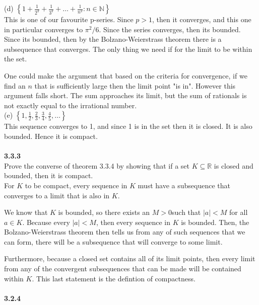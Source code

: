 (d) $\left\{ 1 + \frac{1}{2^2} + \frac{1}{3^2} + \ldots + \frac{1}{n^2} : n\in\mathbb{N} \right\}$
\\

This is one of our favourite p-series.
Since $p>1$, then it converges, and this one in particular converges to $\pi^2 / 6$.
Since the series converges, then its bounded.
Since its bounded, then by the Bolzano-Weierstrass theorem there is a subsequence that converges.
The only thing we need if for the limit to be within the set.

One could make the argument that based on the criteria for convergence, if we find an $n$ that is sufficiently large
then the limit point "is in".
However this argument falls short. The sum approaches its limit, but the sum of rationals is not exactly equal
to the irrational number. 
\\

(e) $\left\{ 1, \frac{1}{2}, \frac{2}{3}, \frac{3}{4}, \frac{4}{5}, \ldots \right\}$
\\

This sequence converges to 1, and since 1 is in the set then it is closed.
It is also bounded.
Hence it is compact.
\\~\\



\textbf{3.3.3}
\\

Prove the converse of theorem 3.3.4 by showing that if a set $K \subseteq \mathbb{R}$ is closed and bounded,
then it is compact.
\\

For $K$ to be compact, every sequence in $K$ must have a subsequence that converges to a limit that
is also in $K$.

We know that $K$ is bounded, so there exists an $M > 0$such that $|a| < M$ for all $a\in K$.
Because every $|a| < M$, then every sequence in $K$ is bounded.
Then, the Bolzano-Weierstrass theorem then tells us from any of such sequences that we can form, there will be a
subsequence that will converge to some limit.

Furthermore, because a closed set contains all of its limit points, then every limit from any of the
convergent subsequences that can be made will be contained within $K$.
This last statement is the defintion of compactness.
\\~\\




\textbf{3.2.4}
\\


